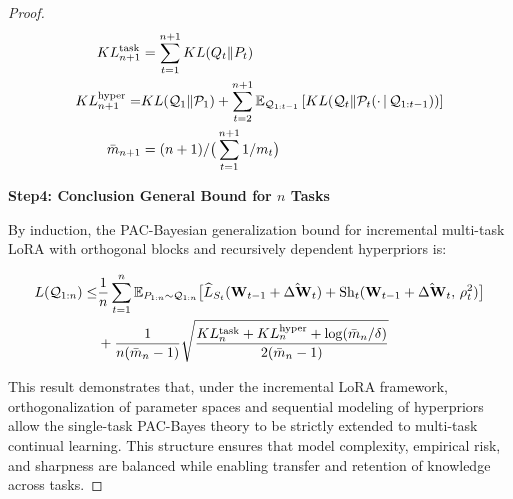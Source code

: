 \documentclass[letterpaper]{article} %
\begin{document}
\begin{proof}
    \begin{equation}
        \begin{aligned}
        KL_{n+1}^{\text{task}} &= \sum_{t=1}^{n+1} KL(Q_t\|P_t)\\
        KL_{n+1}^{\text{hyper}} = & KL(\mathcal{Q}_1\|\mathcal{P}_1)  +\sum_{t=2}^{n+1} \mathbb{E}_{\mathcal{Q}_{1:t-1}}
        \left[ KL(\mathcal{Q}_t \| \mathcal{P}_t(\cdot\,|\,\mathcal{Q}_{1:t-1})) \right] \\
        \bar{m}_{n+1} &= (n+1)/\big(\sum_{t=1}^{n+1} 1/m_t\big) \notag
    \end{aligned}
    \end{equation}

\textbf{Step4: Conclusion General Bound for $n$ Tasks}

By induction, the PAC-Bayesian generalization bound for incremental multi-task LoRA with orthogonal blocks and recursively dependent hyperpriors is:

    \begin{align}
        L(\mathcal{Q}_{1:n}) \leq & \frac{1}{n} \sum_{t=1}^{n}
        \mathbb{E}_{P_{1:n} \sim \mathcal{Q}_{1:n}}\big[
            \widehat{L}_{S_t}(\mathbf{W}_{t-1} + \hat{\Delta\mathbf{W}}_t)  + \mathrm{Sh}_t(\mathbf{W}_{t-1} + \hat{\Delta\mathbf{W}}_t,\, \rho_t^2)
        \big] \notag\\
        & + \frac{1 }{n(\bar{m}_n - 1)}\sqrt{
            \frac{KL_{n}^{\text{task}} + KL_{n}^{\text{hyper}} +\log(\bar{m}_{n}/\delta)}{2(\bar{m}_{n} - 1)}
        }
    \end{align}


 This result demonstrates that, under the incremental LoRA framework, orthogonalization of parameter spaces and sequential modeling of hyperpriors allow the single-task PAC-Bayes theory to be strictly extended to multi-task continual learning. This structure ensures that model complexity, empirical risk, and sharpness are balanced while enabling transfer and retention of knowledge across tasks.




\end{proof}
\end{document}

